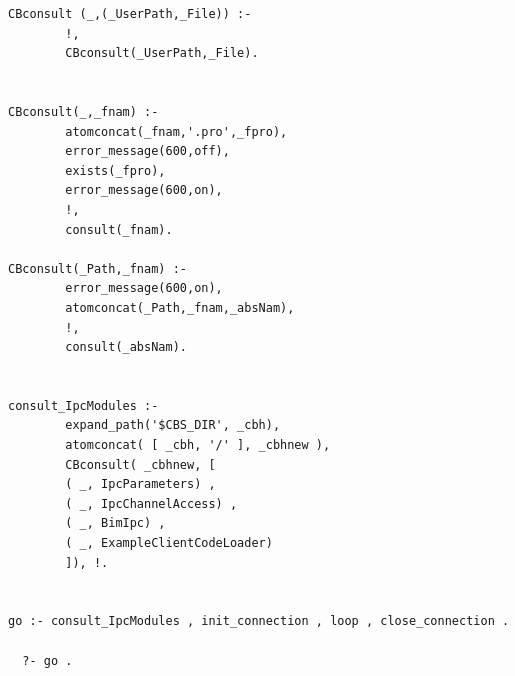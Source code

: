 \begin{verbatim}
CBconsult (_,(_UserPath,_File)) :-
        !,
        CBconsult(_UserPath,_File).


CBconsult(_,_fnam) :-
        atomconcat(_fnam,'.pro',_fpro),
        error_message(600,off),
        exists(_fpro),
        error_message(600,on),
        !,
        consult(_fnam).

CBconsult(_Path,_fnam) :-
        error_message(600,on),
        atomconcat(_Path,_fnam,_absNam),
        !,
        consult(_absNam).


consult_IpcModules :- 
        expand_path('$CBS_DIR', _cbh),
        atomconcat( [ _cbh, '/' ], _cbhnew ),
        CBconsult( _cbhnew, [
        ( _, IpcParameters) , 
        ( _, IpcChannelAccess) ,
        ( _, BimIpc) , 
        ( _, ExampleClientCodeLoader) 
        ]), !.
        

go :- consult_IpcModules , init_connection , loop , close_connection .

  ?- go . 
\end{verbatim}

